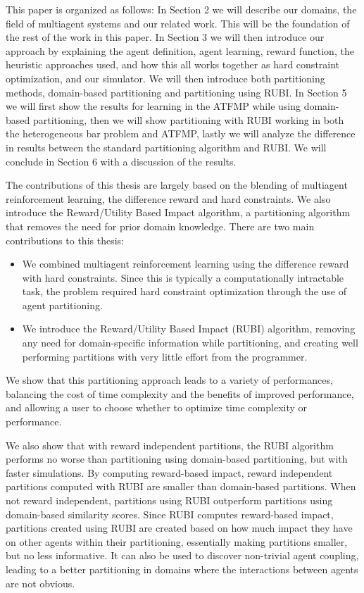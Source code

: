 \documentclass[onehalf,11pt]{beavtex}
\begin{document}
This paper is organized as follows: In Section 2 we will describe our domains, the field of multiagent systems and our related work. This will be the foundation of the rest of the work in this paper. In Section 3 we will then introduce our approach by explaining the agent definition, agent learning, reward function, the heuristic approaches used, and how this all works together as hard constraint optimization, and our simulator. We will then introduce both partitioning methods, domain-based partitioning and partitioning using RUBI. In Section 5 we will first show the results for learning in the ATFMP while using domain-based partitioning, then we will show partitioning with RUBI working in both the heterogeneous bar problem and ATFMP, lastly we will analyze the difference in results between the standard partitioning algorithm and RUBI. We will conclude in Section 6 with a discussion of the results.

The contributions of this thesis are largely based on the blending of multiagent reinforcement learning, the difference reward and hard constraints. We also introduce the Reward/Utility Based Impact algorithm, a partitioning algorithm that removes the need for prior domain knowledge. There are two main contributions to this thesis:

\begin{itemize}
\item We combined multiagent reinforcement learning using the difference reward with hard constraints. Since this is typically a computationally intractable task, the problem required hard constraint optimization through the use of agent partitioning. 

\item We introduce the Reward/Utility Based Impact (RUBI) algorithm, removing any need for domain-specific information while partitioning, and creating well performing partitions with very little effort from the programmer.

\end{itemize}

We show that this partitioning approach leads to a variety of performances, balancing the cost of time complexity and the benefits of improved performance, and allowing a user to choose whether to optimize time complexity or performance. 

We also show that with reward independent partitions, the RUBI algorithm performs no worse than partitioning using domain-based partitioning, but with faster simulations. By computing reward-based impact, reward independent partitions computed with RUBI are smaller than domain-based partitions. When not reward independent, partitions using RUBI outperform partitions using domain-based similarity scores. Since RUBI computes reward-based impact, partitions created using RUBI are created based on how much impact they have on other agents within their partitioning, essentially making partitions smaller, but no less informative. It can also be used to discover non-trivial agent coupling, leading to a better partitioning in domains where the interactions between agents are not obvious. 
\end{document}
